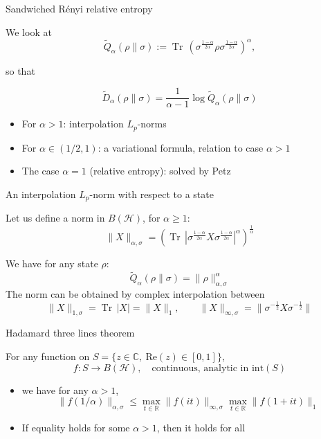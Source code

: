 \documentclass[mathserif]{beamer}
\newcommand{\<}{\langle}
\renewcommand{\>}{\rangle}
\newcommand{\Tr}{\operatorname{Tr}\,}
\newcommand{\Ha}{\mathcal H}
\begin{document}
\begin{frame}{Sandwiched R\'enyi relative entropy}

We look at 
\[
\tilde
Q_\alpha(\rho\|\sigma):=\Tr\left(\sigma^{\frac{1-\alpha}{2\alpha}}\rho\sigma^{\frac{1-\alpha}{2\alpha}}\right)^\alpha,
\]

so that 

\[
\tilde D_\alpha(\rho\|\sigma)=\frac1{\alpha-1}\log \tilde Q_\alpha(\rho\|\sigma)
\]

\bigskip
\begin{itemize}
\item For $\alpha>1$: interpolation $L_p$-norms
\item For $\alpha\in (1/2,1)$: a variational formula, relation to  case $\alpha>1$
\item The case $\alpha=1$ (relative entropy): solved by Petz

\end{itemize}





\end{frame}

\begin{frame}{An interpolation $L_p$-norm with respect to a state}

Let us define a norm in $B(\Ha)$, for $\alpha\ge 1$:
\[
\|X\|_{\alpha,\sigma}=\left( \Tr
|\sigma^{\frac{1-\alpha}{2\alpha}}X\sigma^{\frac{1-\alpha}{2\alpha}}|^\alpha\right)^{\frac1{\alpha}}
\]

We have for any state $\rho$:
\[
\tilde Q_\alpha(\rho\|\sigma)=\|\rho\|_{\alpha,\sigma}^\alpha
\]
The norm can be obtained by complex interpolation between
\[
\|X\|_{1,\sigma}=\Tr|X|=\|X\|_1,\qquad  \|X\|_{\infty,\sigma}=\|\sigma^{-\frac12}X\sigma^{-\frac12}\|
\]


\end{frame}



\begin{frame}{Hadamard three lines theorem}

For any function on $S=\{z\in \mathbb C,\ \mathrm{Re}(z)\in [0,1]\}$,
\[
f:S\to B(\Ha),\quad \text{continuous, analytic in } \mathrm{int}(S)
\]
\begin{itemize}
\item we have for any $\alpha>1$,
\[
\|f(1/\alpha)\|_{\alpha,\sigma}\le \max_{t\in \mathbb R}
\|f(it)\|_{\infty,\sigma}\max_{t\in \mathbb R}\|f(1+it)\|_1
\]
\item If equality holds for some $\alpha>1$, then it holds for all

\end{itemize}


\end{frame}
\end{document}
